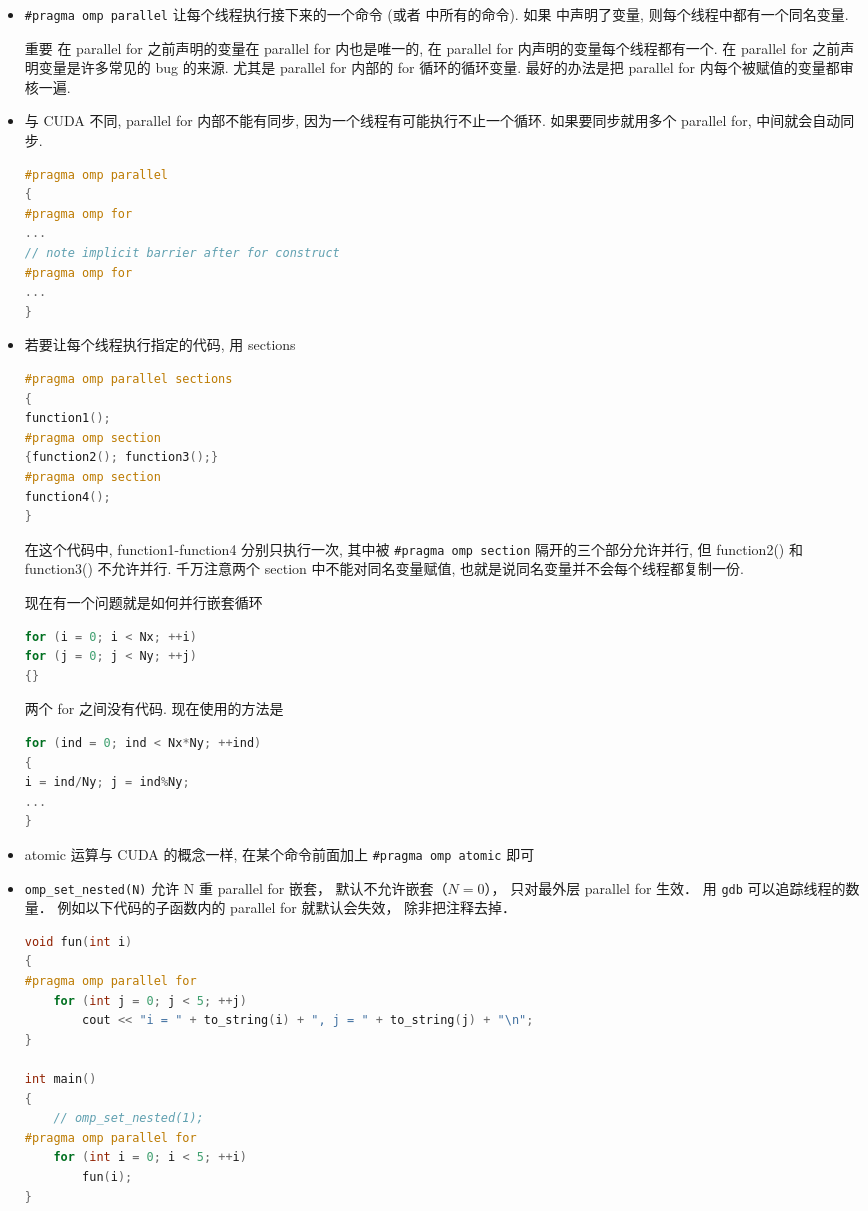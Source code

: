 \begin{itemize}
\item \verb|#pragma omp parallel| 让每个线程执行接下来的一个命令 (或者 {} 中所有的命令). 如果 {} 中声明了变量, 则每个线程中都有一个同名变量.
\item [重要] 在 parallel for 之前声明的变量在 parallel for 内也是唯一的, 在 parallel for 内声明的变量每个线程都有一个. 在 parallel for 之前声明变量是许多常见的 bug 的来源. 尤其是 parallel for 内部的 for 循环的循环变量. 最好的办法是把 parallel for 内每个被赋值的变量都审核一遍.
\item 与 CUDA 不同, parallel for 内部不能有同步, 因为一个线程有可能执行不止一个循环. 如果要同步就用多个 parallel for, 中间就会自动同步.
\begin{lstlisting}[language=cpp]
#pragma omp parallel
{
#pragma omp for
...
// note implicit barrier after for construct
#pragma omp for
...
}
\end{lstlisting}
\item 若要让每个线程执行指定的代码, 用 sections
\begin{lstlisting}[language=cpp]
#pragma omp parallel sections
{
function1();
#pragma omp section
{function2(); function3();}
#pragma omp section
function4();
}
\end{lstlisting}
在这个代码中, function1-function4 分别只执行一次, 其中被 \verb|#pragma omp section| 隔开的三个部分允许并行, 但 function2() 和 function3() 不允许并行. 千万注意两个 section 中不能对同名变量赋值, 也就是说同名变量并不会每个线程都复制一份.

现在有一个问题就是如何并行嵌套循环
\begin{lstlisting}[language=cpp]
for (i = 0; i < Nx; ++i)
for (j = 0; j < Ny; ++j)
{}
\end{lstlisting}
两个 for 之间没有代码. 现在使用的方法是
\begin{lstlisting}[language=cpp]
for (ind = 0; ind < Nx*Ny; ++ind)
{
i = ind/Ny; j = ind%Ny;
...
}
\end{lstlisting}
\item atomic 运算与 CUDA 的概念一样, 在某个命令前面加上 \verb|#pragma omp atomic| 即可
\item \verb|omp_set_nested(N)| 允许 N 重 parallel for 嵌套， 默认不允许嵌套（$N=0$）， 只对最外层 parallel for 生效． 用 \verb|gdb| 可以追踪线程的数量． 例如以下代码的子函数内的 parallel for 就默认会失效， 除非把注释去掉．
\begin{lstlisting}[language=cpp]
void fun(int i)
{
#pragma omp parallel for
	for (int j = 0; j < 5; ++j)
		cout << "i = " + to_string(i) + ", j = " + to_string(j) + "\n";
}

int main()
{
	// omp_set_nested(1);
#pragma omp parallel for
	for (int i = 0; i < 5; ++i)
		fun(i);
}
\end{lstlisting}
\end{itemize}
